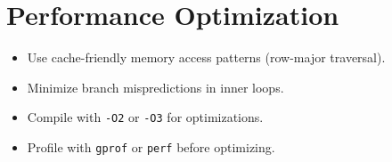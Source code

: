 \documentclass[11pt,a4paper]{article}
\begin{document}
\section{Performance Optimization}
\begin{itemize}
  \item Use cache-friendly memory access patterns (row-major traversal).
  \item Minimize branch mispredictions in inner loops.
  \item Compile with \texttt{-O2} or \texttt{-O3} for optimizations.
  \item Profile with \texttt{gprof} or \texttt{perf} before optimizing.
\end{itemize}
\end{document}
